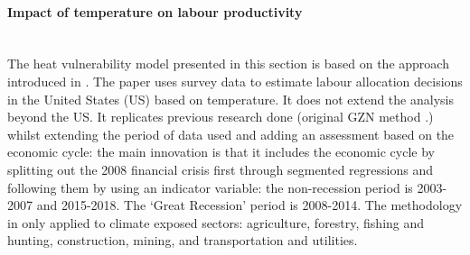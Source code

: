 \documentclass[a4paper,11pt]{extarticle} %
\theoremstyle{definition}
\begin{document}
\paragraph{Impact of temperature on labour productivity\\}
\textbf{\\}
The heat vulnerability model presented in this section is based on the approach introduced in \cite{NeidellEtAl:2021}. The paper uses survey data to estimate labour allocation decisions in the United States (US) based on temperature. It does not extend the analysis beyond the US. It replicates previous research done (original GZN method \cite{NeidellEtAl:2014}.) whilst extending the period of data used and adding an assessment based on the economic cycle: the main innovation is that it includes the economic cycle by splitting out the 2008 financial crisis first through segmented regressions and following them by using an indicator variable: the non-recession period is 2003-2007 and 2015-2018. The `Great Recession' period is 2008-2014. The methodology in only applied to climate exposed sectors: agriculture, forestry, fishing and hunting, construction, mining, and transportation and utilities.
\end{document}
